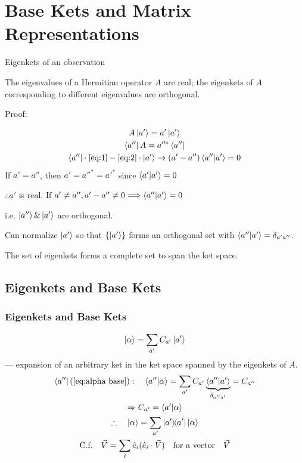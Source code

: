 \section{Base Kets and Matrix Representations}
\begin{frame}{Eigenkets of an observation}
	\begin{theorem}[1]
		The eigenvalues of a Hermitian operator $A$ are real; the eigenkets of $A$ corresponding to different eigenvalues are orthogonal.
	\end{theorem}
	Proof:

	\begin{gather}
		A\ket{a'} = a'\ket{a'} \label{eq:1}\\
		\bra{a'' }A = a''^* \bra{a''} \label{eq:2}\\
		\bra{a''} \cdot \ref{eq:1} - \ref{eq:2}\cdot \ket{a'} \to (a'-a'') \ip{a''}{a'} = 0
	\end{gather}
	If $a'=a''$, then $a'=a''^*=a'^*$ since $\ip{a'}{a'} = 0$

	$\therefore a'$ is real. If $a'\ne a'', a'-a'' \ne 0 \Longrightarrow \ip{a''}{a'} = 0$

	i.e. $\ket{a''} \& \ket{a'}$ are orthogonal.

\end{frame}
\begin{frame}
	Can normalize $\ket{a'}$ so that $\{\ket{a'}\}$ forms an orthogonal set with $\ip{a''}{a'}= \delta_{a' a''}$.

	The set of eigenkets forms a complete set to span the ket space.
\end{frame}

\subsection{Eigenkets and Base Kets}
\begin{frame}
	\frametitle{Eigenkets and Base Kets}

	\begin{equation}\label{eq:alpha base}
		\ket{\alpha} = \sum_{a'} C_{a'} \ket{a'}
	\end{equation}
	--- expansion of an arbitrary ket in the ket space spanned by the eigenkets of $A$.
	\begin{gather*}
		\bra{a''} (\ref{eq:alpha base}): \quad \ip{a''}{\alpha} = \sum_{a'} C_{a'} \underbrace{\ip{a''}{a'}}_{\delta_{a'' a'}} = C_{a''}\\
		\Rightarrow C_{a'} = \ip{a'}{\alpha}\\
		\therefore \quad \ket{\alpha} = \sum_{a'} \op{a'}\ket{\alpha}\\
		\text{C.f.} \quad \vec{V} = \sum_i \hat e_i (\hat e_i \cdot \vec V) \qq{for a vector} \vec V
	\end{gather*}
\end{frame}


